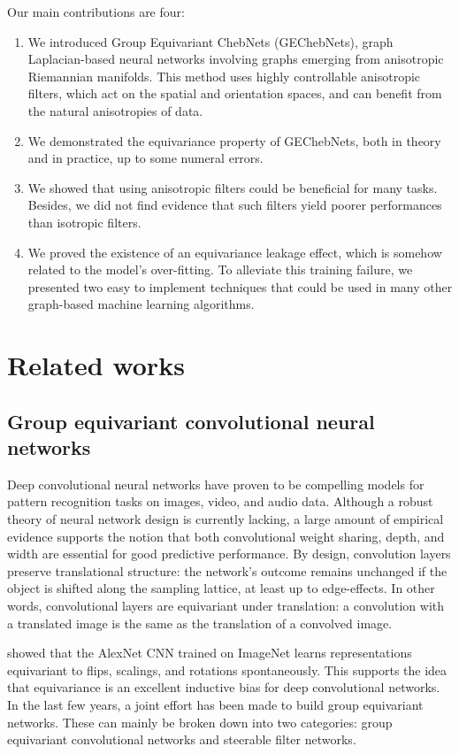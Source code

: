 \documentclass{article}
\begin{document}
Our main contributions are four:
\begin{enumerate}
    \item We introduced Group Equivariant ChebNets (GEChebNets), graph Laplacian-based neural networks involving graphs emerging from anisotropic Riemannian manifolds. This method uses highly controllable anisotropic filters, which act on the spatial and orientation spaces, and can benefit from the natural anisotropies of data.
    \item We demonstrated the equivariance property of GEChebNets, both in theory and in practice, up to some numeral errors.
    \item We showed that using anisotropic filters could be beneficial for many tasks. Besides, we did not find evidence that such filters yield poorer performances than isotropic filters.
    \item We proved the existence of an equivariance leakage effect, which is somehow related to the model's over-fitting. To alleviate this training failure, we presented two easy to implement techniques that could be used in many other graph-based machine learning algorithms.
\end{enumerate}

\section{Related works} \label{sec:related_works}

\subsection{Group equivariant convolutional neural networks}

Deep convolutional neural networks \citep{lecun1995convolutional} have proven to be compelling models for pattern recognition tasks on images, video, and audio data. Although a robust theory of neural network design is currently lacking, a large amount of empirical evidence supports the notion that both convolutional weight sharing, depth, and width are essential for good predictive performance. By design, convolution layers preserve translational structure: the network's outcome remains unchanged if the object is shifted along the sampling lattice, at least up to edge-effects. In other words, convolutional layers are equivariant under translation: a convolution with a translated image is the same as the translation of a convolved image.

\citet{lenc2015understanding} showed that the AlexNet CNN \citet{krizhevsky2012imagenet} trained on ImageNet learns representations equivariant to flips, scalings, and rotations spontaneously. This supports the idea that equivariance is an excellent inductive bias for deep convolutional networks. In the last few years, a joint effort has been made to build group equivariant networks. These can mainly be broken down into two categories: group equivariant convolutional networks and steerable filter networks. 
\end{document}
